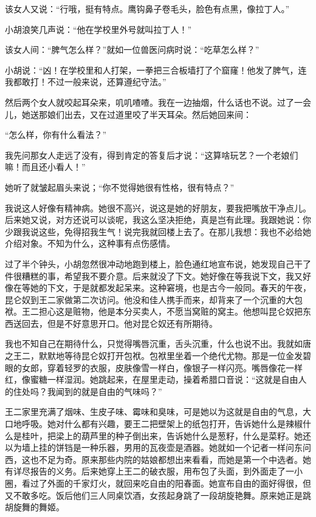 该女人又说：“行哦，挺有特点。鹰钩鼻子卷毛头，脸色有点黑，像拉丁人。” 

小胡浪笑几声说：“他在学校里外号就叫拉丁人！” 

该女人间：“脾气怎么样？”就如一位兽医问病时说：“吃草怎么样？” 

小胡说：“凶！在学校里和人打架，一拳把三合板墙打了个窟窿！他发了脾气，连我都敢打！不过一般来说，还算遵纪守法。” 

然后两个女人就咬起耳朵来，叽叽喳喳。我在一边抽烟，什么话也不说。过了一会儿，她送那娘们出去，又在过道里咬了半天耳朵。然后她回来间： 

“怎么样，你有什么看法？” 

我先问那女人走远了没有，得到肯定的答复后才说：“这算啥玩艺？一个老娘们嘛！而且还小看人！” 

她听了就皱起眉头来说；“你不觉得她很有性格，很有特点？” 

我说这人好像有精神病。她很不高兴，说这是她的好朋友，要我把嘴放干净点儿。后来她又说，对方还说可以谈呢，我这么坚决拒绝，真是岂有此理。我跟她说：你少跟我说这些，免得招我生气！说完我就回楼上去了。在那儿我想：我也不必给她介绍对象。不知为什么，这种事有点伤感情。 

过了半个钟头，小胡忽然很冲动地跑到楼上，脸色通红地宣布说，她发现自己干了件很糟糕的事，希望我不要介意。后来就没了下文。她好像在等我说下文，我又好像在等她的下文，于是就都发起呆来。这种窘境，也是古今一般同。春天的午夜，昆仑奴到王二家做第二次访问。他没和佳人携手而来，却背来了一个沉重的大包袱。王二担心这是赃物，他是本分买卖人，不愿当窝赃的窝主。他想叫昆仑奴把东西送回去，但是不好意思开口。他对昆仑奴还有所期待。 

我也不知自己在期待什么，只觉得嘴唇沉重，舌头沉重，什么也说不出。我就如唐之王二，默默地等待昆仑奴打开包袱。包袱里坐着一个绝代尤物。那是一位金发碧眼的女郎，穿着轻罗的衣服，皮肤像雪一样白，像银子一样闪亮。嘴唇像花一样红，像蜜糖一样湿润。她跳起来，在屋里走动，操着希腊口音说：“这就是自由人的住处吗？我闻到的就是自由的气味吗？” 

王二家里充满了烟味、生皮子味、霉味和臭味，可是她以为这就是自由的气息，大口地呼吸。她对什么都有兴趣，要王二把壁架上的纸包打开，告诉她什么是辣椒什么是桂叶，把梁上的葫芦里的种子倒出来，告诉她什么是葱籽，什么是菜籽。她还以为墙上挂的饼铛是一种乐器，男用的瓦夜壶是酒器。她就如一个记者一样问东问西，这也不足为奇。原来那些内院的姑娘都想出来看看，而她是第一个中选者。她有详尽报告的义务。后来她穿上王二的破衣服，用布包了头面，到外面走了一小圈，看过了外面的千家灯火，就回来吃自由的阳春面。她宣布自由的面好得很，但又不敢多吃。饭后他们三人同桌饮酒，女孩起身跳了一段胡旋艳舞。原来她正是跳胡旋舞的舞姬。 

